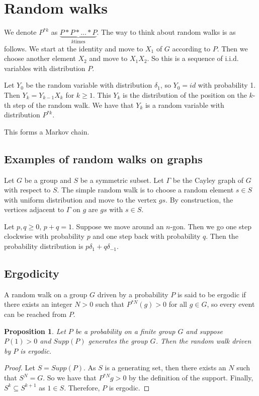 \documentclass[]{article}
\newtheorem{proposition}[theorem]{Proposition}
\theoremstyle{definition}
\numberwithin{theorem}{section}
\numberwithin{equation}{section}
\begin{document}
\section{Random walks}
We denote $P^{\ast k}$ as $\underbrace{P \ast P \ast ... \ast P}_{k \text{times}}$. 
The way to think about random walks is as follows. We start at the identity and move to $X_1$ of $G$ according to $P$. Then we choose another element $X_2$ and move to $X_1 X_2$. So this is a sequence of i.i.d. variables with distribution $P$.

Let $Y_0$ be the random variable with distribution $\delta_1$, so $Y_0 = id$ with probability 1. Then $Y_k = Y_{k-1} X_k$ for $k \geq 1$. This $Y_k$ is the distribution of the position on the $k$-th step of the random walk. We have that $Y_k$ is a random variable with distribution $P^{\ast k}$. 

This forms a Markov chain. 
\subsection{Examples of random walks on graphs}
Let  $G$ be a group and $S$ be a symmetric subset. Let $\Gamma$ be the Cayley graph of $G$ with respect to $S$. The simple random walk is to choose a random element $s \in S$ with uniform distribution and move to the vertex $gs$. By construction, the vertices adjacent to $\Gamma$ on $g$ are $gs$ with $s \in S$.

Let $p, q \geq 0$, $p + q = 1$. Suppose we move around an $n$-gon. Then we go one step clockwise with probability $p$ and one step back with probability $q$. Then the probability distribution is $p \delta_1 + q \delta_{-1}$. 

\subsection{Ergodicity}
A random walk on a group $G$ driven by a probability $P$ is said to be ergodic if there exists an integer $N > 0$ such that $P^{\ast N}(g) > 0$ for all $g \in G$, so every event can be reached from $P$. 

\begin{proposition}
	Let $P$ be a probability on a finite group $G$ and suppose $P(1) > 0$ and $Supp(P)$ generates the group $G$. Then the random walk driven by $P$ is ergodic.
\end{proposition}

\begin{proof}
	Let $S = Supp(P)$. As $S$ is a generating set, then there exists an $N$ such that $S^N = G$. So we have that $P^{\ast N} g > 0$ by the definition of the support. Finally, $S^{k} \subseteq S^{k + 1}$ as $1 \in S$. Therefore, $P$ is ergodic. 
\end{proof}
\end{document}
